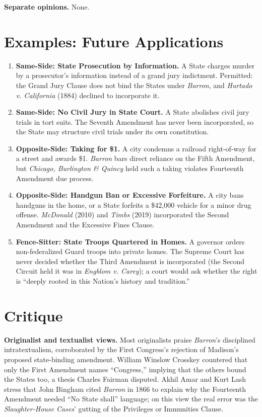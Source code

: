 \documentclass[12pt]{article}
\begin{document}
\textbf{Separate opinions.} None.

\section{Examples: Future Applications}

\begin{enumerate}
\item \textbf{Same-Side: State Prosecution by Information.} A State charges murder by a prosecutor's information instead of a grand jury indictment. Permitted: the Grand Jury Clause does not bind the States under \textit{Barron}, and \textit{Hurtado v. California} (1884) declined to incorporate it.
\item \textbf{Same-Side: No Civil Jury in State Court.} A State abolishes civil jury trials in tort suits. The Seventh Amendment has never been incorporated, so the State may structure civil trials under its own constitution.
\item \textbf{Opposite-Side: Taking for \$1.} A city condemns a railroad right-of-way for a street and awards \$1. \textit{Barron} bars direct reliance on the Fifth Amendment, but \textit{Chicago, Burlington \& Quincy} held such a taking violates Fourteenth Amendment due process.
\item \textbf{Opposite-Side: Handgun Ban or Excessive Forfeiture.} A city bans handguns in the home, or a State forfeits a \$42,000 vehicle for a minor drug offense. \textit{McDonald} (2010) and \textit{Timbs} (2019) incorporated the Second Amendment and the Excessive Fines Clause.
\item \textbf{Fence-Sitter: State Troops Quartered in Homes.} A governor orders non-federalized Guard troops into private homes. The Supreme Court has never decided whether the Third Amendment is incorporated (the Second Circuit held it was in \textit{Engblom v. Carey}); a court would ask whether the right is ``deeply rooted in this Nation's history and tradition.''
\end{enumerate}

\section{Critique}

\textbf{Originalist and textualist views.} Most originalists praise \textit{Barron}'s disciplined intratextualism, corroborated by the First Congress's rejection of Madison's proposed state-binding amendment. William Winslow Crosskey countered that only the First Amendment names ``Congress,'' implying that the others bound the States too, a thesis Charles Fairman disputed. Akhil Amar and Kurt Lash stress that John Bingham cited \textit{Barron} in 1866 to explain why the Fourteenth Amendment needed ``No State shall'' language; on this view the real error was the \textit{Slaughter-House Cases}' gutting of the Privileges or Immunities Clause.
\end{document}
